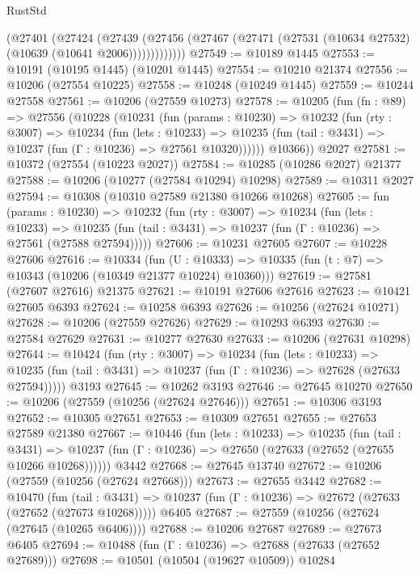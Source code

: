 \begin{lexlean}{RustStd}
\begin{coremodule}
            (@27401
              (@27424
                (@27439
                  (@27456 (@27467 (@27471 (@27531 (@10634 @27532) (@10639 (@10641 @2006)))))))))))))
@27549 := @10189 @1445
@27553 := @10191 (@10195 @1445) (@10201 @1445)
@27554 := @10210 @21374
@27556 := @10206 (@27554 @10225)
@27558 := @10248 (@10249 @1445)
@27559 := @10244 @27558
@27561 := @10206 (@27559 @10273)
@27578 := @10205
    (fun (fn : @89) =>
    @27556
      (@10228
        (@10231
          (fun (params : @10230) =>
          @10232
            (fun (rty : @3007) =>
            @10234
              (fun (lets : @10233) =>
              @10235 (fun (tail : @3431) => @10237 (fun (Γ : @10236) => @27561 @10320))))))
        @10366))
    @2027
@27581 := @10372 (@27554 (@10223 @2027))
@27584 := @10285 (@10286 @2027) @21377
@27588 := @10206 (@10277 (@27584 @10294) @10298)
@27589 := @10311 @2027
@27594 := @10308 (@10310 @27589 @21380 @10266 @10268)
@27605 := fun (params : @10230) =>
  @10232
    (fun (rty : @3007) =>
    @10234
      (fun (lets : @10233) =>
      @10235 (fun (tail : @3431) => @10237 (fun (Γ : @10236) => @27561 (@27588 @27594)))))
@27606 := @10231 @27605
@27607 := @10228 @27606
@27616 := @10334
    (fun (U : @10333) => @10335 (fun (t : @7) => @10343 (@10206 (@10349 @21377 @10224) @10360)))
@27619 := @27581 (@27607 @27616) @21375
@27621 := @10191 @27606 @27616
@27623 := @10421 @27605 @6393
@27624 := @10258 @6393
@27626 := @10256 (@27624 @10271)
@27628 := @10206 (@27559 @27626)
@27629 := @10293 @6393
@27630 := @27584 @27629
@27631 := @10277 @27630
@27633 := @10206 (@27631 @10298)
@27644 := @10424
    (fun (rty : @3007) =>
    @10234
      (fun (lets : @10233) =>
      @10235 (fun (tail : @3431) => @10237 (fun (Γ : @10236) => @27628 (@27633 @27594)))))
    @3193
@27645 := @10262 @3193
@27646 := @27645 @10270
@27650 := @10206 (@27559 (@10256 (@27624 @27646)))
@27651 := @10306 @3193
@27652 := @10305 @27651
@27653 := @10309 @27651
@27655 := @27653 @27589 @21380
@27667 := @10446
    (fun (lets : @10233) =>
    @10235
      (fun (tail : @3431) =>
      @10237 (fun (Γ : @10236) => @27650 (@27633 (@27652 (@27655 @10266 @10268))))))
    @3442
@27668 := @27645 @13740
@27672 := @10206 (@27559 (@10256 (@27624 @27668)))
@27673 := @27655 @3442
@27682 := @10470
    (fun (tail : @3431) => @10237 (fun (Γ : @10236) => @27672 (@27633 (@27652 (@27673 @10268)))))
    @6405
@27687 := @27559 (@10256 (@27624 (@27645 (@10265 @6406))))
@27688 := @10206 @27687
@27689 := @27673 @6405
@27694 := @10488 (fun (Γ : @10236) => @27688 (@27633 (@27652 @27689)))
@27698 := @10501 (@10504 (@19627 @10509)) @10284

\end{coremodule}
\end{lexlean}
